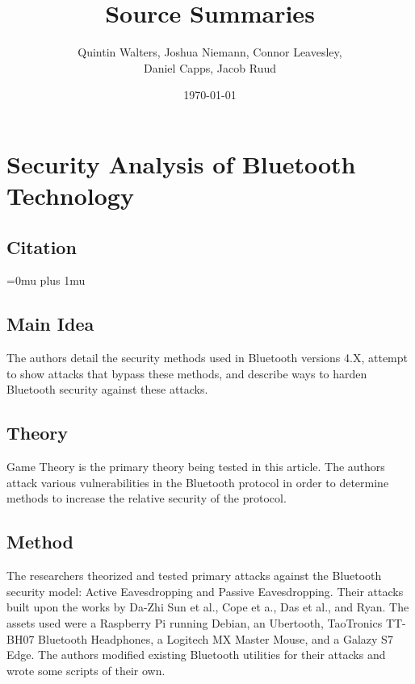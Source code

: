 \documentclass[letterpaper,12pt]{article}
\begin{document}
	\nobibliography*
	
    \title{Source Summaries}
    \author{Quintin Walters, Joshua Niemann, Connor Leavesley,\\
    Daniel Capps, Jacob Ruud}
    \date{\today}
    \maketitle
\break
\tableofcontents
\break

\noindent
\section{Security Analysis of Bluetooth Technology}

\noindent
\subsection{Citation}

\Urlmuskip=0mu plus 1mu\relax
{}

\subsection{Main Idea}

\noindent
The authors detail the security methods used in Bluetooth versions 4.X, attempt to show attacks that bypass these methods, and describe ways to harden Bluetooth security against these attacks.  

\subsection{Theory}

\noindent
Game Theory is the primary theory being tested in this article.  The authors attack various vulnerabilities in the Bluetooth protocol in order to determine methods to increase the relative security of the protocol.

\subsection{Method}

\noindent
The researchers theorized and tested primary attacks against the Bluetooth security model: Active Eavesdropping and Passive Eavesdropping.  Their attacks built upon the works by Da-Zhi Sun et al., Cope et a., Das et al., and Ryan.  The assets used were a Raspberry Pi running Debian, an Ubertooth, TaoTronics TT-BH07 Bluetooth Headphones, a Logitech MX Master Mouse, and a Galazy S7 Edge.  The authors modified existing Bluetooth utilities for their attacks and wrote some scripts of their own.
\end{document}
